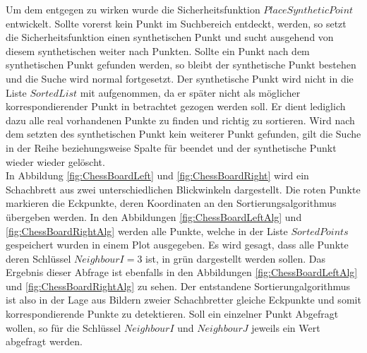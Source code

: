 Um dem entgegen zu wirken wurde die Sicherheitsfunktion $PlaceSyntheticPoint$ entwickelt. Sollte vorerst kein Punkt im Suchbereich entdeckt, werden, so setzt die Sicherheitsfunktion einen synthetischen Punkt und sucht ausgehend von diesem synthetischen weiter nach Punkten. Sollte ein Punkt nach dem synthetischen Punkt gefunden werden, so bleibt der synthetische Punkt bestehen und die Suche wird normal fortgesetzt. Der synthetische Punkt wird nicht in die Liste $SortedList$ mit aufgenommen, da er später nicht als möglicher korrespondierender Punkt in betrachtet gezogen werden soll. Er dient lediglich dazu alle real vorhandenen Punkte zu finden und richtig zu sortieren.
Wird nach dem setzten des synthetischen Punkt kein weiterer Punkt gefunden, gilt die Suche in der Reihe beziehungsweise Spalte für beendet und der synthetische Punkt wieder wieder gelöscht. \\


%
%
%


In Abbildung \ref{fig:ChessBoardLeft} und \ref{fig:ChessBoardRight} wird ein Schachbrett aus zwei unterschiedlichen Blickwinkeln dargestellt. Die roten Punkte markieren die Eckpunkte, deren Koordinaten an den Sortierungsalgorithmus übergeben werden. In den Abbildungen \ref{fig:ChessBoardLeftAlg} und \ref{fig:ChessBoardRightAlg} werden alle Punkte, welche in der Liste $SortedPoints$ gespeichert wurden in einem Plot ausgegeben. Es wird gesagt, dass alle Punkte deren Schlüssel $NeighbourI = 3$ ist, in grün dargestellt werden sollen. Das Ergebnis dieser Abfrage ist ebenfalls in den Abbildungen \ref{fig:ChessBoardLeftAlg} und \ref{fig:ChessBoardRightAlg} zu sehen. Der entstandene Sortierungalgorithmus ist also in der Lage aus Bildern zweier Schachbretter gleiche Eckpunkte und somit korrespondierende Punkte zu detektieren. Soll ein einzelner Punkt Abgefragt wollen, so für die Schlüssel $NeighbourI$ und $NeighbourJ$ jeweils ein Wert abgefragt werden.


